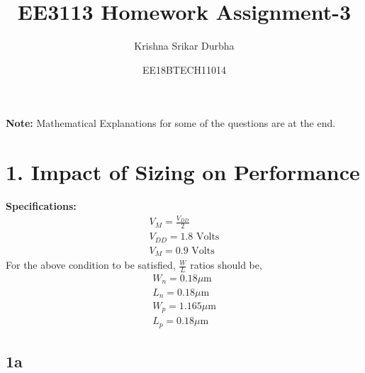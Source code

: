 \documentclass{article}
\title{EE3113 Homework Assignment-3}
\author{Krishna Srikar Durbha}
\date{EE18BTECH11014}
\begin{document}
\maketitle
\textbf{Note:} Mathematical Explanations for some of the questions are at the end. 
\section{1. Impact of Sizing on Performance}
\textbf{Specifications:}
\begin{align}
    V_{M} = \frac{V_{DD}}{2}\\
    V_{DD} = 1.8 \text{ Volts}\\
    V_{M} = 0.9 \text{ Volts}
\end{align}
For the above condition to be satisfied, $\frac{W}{L}$ ratios should be,
\begin{align}
    W_{n} = 0.18\mu \text{m}\\
    L_{n} = 0.18\mu \text{m}\\
    W_{p} = 1.165\mu \text{m}\\
    L_{p} = 0.18\mu \text{m}
\end{align}
\subsection{1a}
\end{document}
